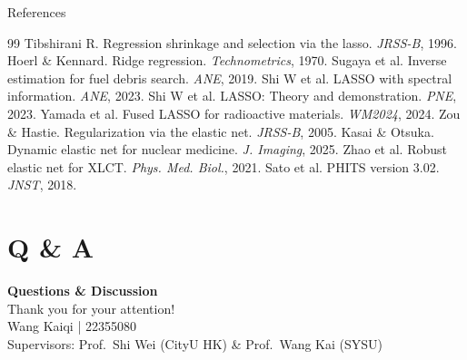 \documentclass{sysupptthesis}
\begin{document}
\begin{frame}[allowframebreaks]{References}
    \small
    \begin{thebibliography}{99}
         Tibshirani R. Regression shrinkage and selection via the lasso. \textit{JRSS-B}, 1996.
         Hoerl \& Kennard. Ridge regression. \textit{Technometrics}, 1970.
         Sugaya et al. Inverse estimation for fuel debris search. \textit{ANE}, 2019.
         Shi W et al. LASSO with spectral information. \textit{ANE}, 2023.
         Shi W et al. LASSO: Theory and demonstration. \textit{PNE}, 2023.
         Yamada et al. Fused LASSO for radioactive materials. \textit{WM2024}, 2024.
         Zou \& Hastie. Regularization via the elastic net. \textit{JRSS-B}, 2005.
         Kasai \& Otsuka. Dynamic elastic net for nuclear medicine. \textit{J. Imaging}, 2025.
         Zhao et al. Robust elastic net for XLCT. \textit{Phys. Med. Biol.}, 2021.
         Sato et al. PHITS version 3.02. \textit{JNST}, 2018.
    \end{thebibliography}
\end{frame}

\section{Q \& A}

\begin{frame}
    \begin{center}
        {\Huge\textbf{Questions \& Discussion}}\\[2em]
        {\Large Thank you for your attention!}\\[1em]
        {\normalsize Wang Kaiqi | 22355080}\\[0.3em]
        {\small Supervisors: Prof.\ Shi Wei (CityU HK) \& Prof.\ Wang Kai (SYSU)}
    \end{center}
\end{frame}
\end{document}
